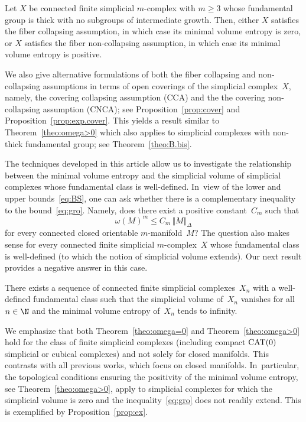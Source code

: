 \begin{corollary}
Let $X$ be connected finite simplicial $m$\nobreakdash-complex with $m \geq 3$ whose fundamental group is thick with no subgroups of intermediate growth.
Then, either $X$ satisfies the fiber collapsing assumption, in which case its minimal volume entropy is zero, or $X$ satisfies the fiber non-collapsing assumption, in which case its minimal volume entropy is positive.
\end{corollary}

We also give alternative formulations of both the fiber collapsing and non-collapsing assumptions in terms of open coverings of the simplicial complex~$X$, namely, the covering collapsing assumption (CCA) and the the covering non-collapsing assumption (CNCA); see Proposition~\ref{prop:cover} and Proposition~\ref{prop:exp.cover}.
This yields a result similar to Theorem~\ref{theo:omega>0} which also applies to simplicial complexes with non-thick fundamental group; see Theorem~\ref{theo:B.bis}.

The techniques developed in this article allow us to investigate the relationship between the minimal volume entropy and the simplicial volume of simplicial complexes whose fundamental class is well-defined. In~view of the lower and upper bounds~\eqref{eq:BS}, one can ask whether there is a complementary inequality to the bound~\eqref{eq:gro}.
Namely, does there exist a positive constant~$C_m$ such that
\[
\omega(M)^m \leq C_m \, \Vert M \Vert_\Delta
\]
for every connected closed orientable $m$\nobreakdash-manifold~$M$?
The question also makes sense for every connected finite simplicial $m$\nobreakdash-complex~$X$ whose fundamental class is well-defined (to which the notion of simplicial volume extends).
Our next result provides a negative answer in this case.

\begin{proposition} \label{prop:ex}
There exists a sequence of connected finite simplicial complexes~$X_n$ with a well-defined fundamental class such that the simplicial volume of~$X_n$ vanishes for all $n \in \N$ and the minimal volume entropy of~$X_n$ tends to infinity.
\end{proposition}

We emphasize that both Theorem~\ref{theo:omega=0} and Theorem~\ref{theo:omega>0} hold for the class of finite simplicial complexes (including compact ${\rm CAT}(0)$ simplicial or cubical complexes) and not solely for closed manifolds.
This contrasts with all previous works, which focus on closed manifolds. In~particular, the topological conditions ensuring the positivity of the minimal volume entropy, see Theorem~\ref{theo:omega>0}, apply to simplicial complexes for which the simplicial volume is zero and the inequality~\eqref{eq:gro} does not readily extend.
This is exemplified by Proposition~\ref{prop:ex}.

